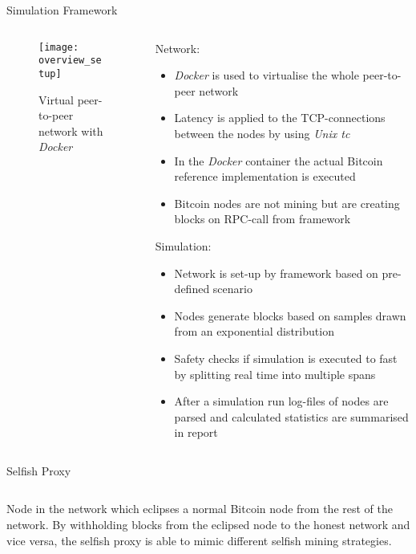 \documentclass[final,hyperref={pdfpagelabels=true}]{beamer}
\begin{document}
\begin{frame}
  \begin{block}{Simulation Framework}
  \begin{columns}[t]

    \begin{column}{.3\textwidth}
		
		\begin{figure}[t]
		    \vspace*{-1cm}
			\texttt{[image: overview\_setup]}
			\centering
			\caption{Virtual peer-to-peer network with \textit{Docker}}
		\end{figure}      	
      
    \end{column}

    \begin{column}{.6\textwidth}
    	Network:
     	\begin{itemize}
     		\item \textit{Docker} is used to virtualise the whole peer-to-peer network
     		\item Latency is applied to the TCP-connections between the nodes by using \textit{Unix tc}
     		\item In the \textit{Docker} container the actual Bitcoin reference implementation is executed
     		\item Bitcoin nodes are not mining but are creating blocks on RPC-call from framework
     	\end{itemize}
     	Simulation:
       	\begin{itemize}
     		\item Network is set-up by framework based on pre-defined scenario
     		\item Nodes generate blocks based on samples drawn from an exponential distribution
     		\item Safety checks if simulation is executed to fast by splitting real time into multiple spans
     		\item After a simulation run log-files of nodes are parsed and calculated statistics are summarised in report 	\end{itemize}
    \end{column}

  \end{columns}
  \end{block}
  
  \begin{block}{Selfish Proxy}
  	\begin{columns}[t]
     	\begin{column}{.45\textwidth}
     		Node in the network which eclipses a normal Bitcoin node from the rest of the network. By withholding blocks from the eclipsed node to the honest network and vice versa, the selfish proxy is able to mimic different selfish mining strategies.
     		

\end{column}
\end{columns}
\end{block}
\end{frame}
\end{document}
